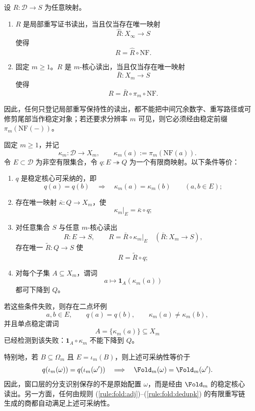 \begin{proposition}[局部证书读出只能经过折叠核心]\label{prop:distill-stallings-local-rewrite-certified-readout-factorization}
设 \(R:\mathcal D\to S\) 为任意映射。
\begin{enumerate}
  \item \(R\) 是局部重写证书读出，当且仅当存在唯一映射
  \[
  \widehat R:X_\infty\to S
  \]
  使得
  \[
  R=\widehat R\circ\mathrm{NF}.
  \]
  \item 固定 \(m\ge1\)。\(R\) 是 \(m\)-核心读出，当且仅当存在唯一映射
  \[
  \bar R:X_m\to S
  \]
  使得
  \[
  R=\bar R\circ\pi_m\circ\mathrm{NF}.
  \]
\end{enumerate}
因此，任何只登记局部重写保持性的读出，都不能把中间冗余数字、重写路径或可修剪尾部当作稳定对象；若还要求分辨率 \(m\) 可见，则它必须经由稳定前缀 \(\pi_m(\mathrm{NF}(-))\)。
\end{proposition}
\begin{proposition}[稳定核心商的可采纳性判别与最坏坏例]
\label{distill:stallings_foldings_and_bestvina_handel_train_tracks-local_fold_preserves_represented_object-stable-core-quotient-worst-witness}
固定 \(m\ge1\)，并记
\[
\kappa_m:\mathcal D\longrightarrow X_m,
\qquad
\kappa_m(a):=\pi_m(\mathrm{NF}(a)).
\]
令 \(E\subset\mathcal D\) 为非空有限集合，令 \(q:E\twoheadrightarrow Q\) 为一个有限商映射。以下条件等价：
\begin{enumerate}
  \item \(q\) 是稳定核心可采纳的，即
  \[
  q(a)=q(b)\quad\Longrightarrow\quad \kappa_m(a)=\kappa_m(b)
  \qquad(a,b\in E);
  \]
  \item 存在唯一映射 \(\bar\kappa:Q\to X_m\)，使
  \[
  \kappa_m|_E=\bar\kappa\circ q;
  \]
  \item 对任意集合 \(S\) 与任意 \(m\)-核心读出
  \[
  R:E\to S,
  \qquad
  R=\bar R\circ\kappa_m|_E
  \quad(\bar R:X_m\to S),
  \]
  存在唯一 \(\widetilde R:Q\to S\) 使
  \[
  R=\widetilde R\circ q;
  \]
  \item 对每个子集 \(A\subseteq X_m\)，谓词
  \[
  a\longmapsto \mathbf 1_A(\kappa_m(a))
  \]
  都可下降到 \(Q\)。
\end{enumerate}
若这些条件失败，则存在二点坏例
\[
 a,b\in E,
 \qquad q(a)=q(b),
 \qquad \kappa_m(a)\ne\kappa_m(b),
\]
并且单点稳定谓词
\[
A=\{\kappa_m(a)\}\subseteq X_m
\]
已经检测到该失败：\(\mathbf 1_A\circ\kappa_m\) 不能下降到 \(Q\)。

特别地，若 \(B\subseteq\Omega_m\) 且 \(E=\iota_m(B)\)，则上述可采纳性等价于
\[
q(\iota_m(\omega))=q(\iota_m(\omega'))
\quad\Longrightarrow\quad
\Fold_m(\omega)=\Fold_m(\omega') .
\]
因此，窗口层的分支识别保存的不是原始配置 \(\omega\)，而是经由
\(\Fold_m\) 的稳定核心读出。另一方面，任何由规则
\textup{(\ref{rule:fold:adj})--(\ref{rule:fold:dedupk})} 的有限重写链生成的商都自动满足上述可采纳性。
\end{proposition}
